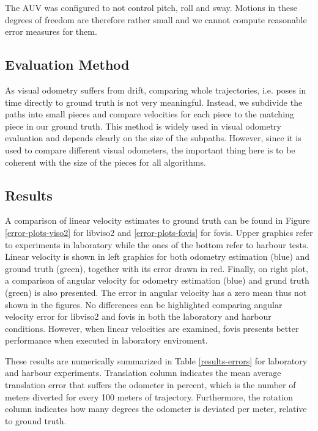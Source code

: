 \documentclass[conference]{IEEEtran}
\begin{document}
The AUV was configured to not control pitch, roll and sway. Motions in these degrees of freedom are therefore rather small and we cannot compute reasonable error measures for them.

\subsection{Evaluation Method
  \label{evaluation-method}
}

As visual odometry suffers from drift, comparing whole trajectories, i.e. poses in time directly to ground truth is not very meaningful. Instead, we subdivide the paths into small pieces and compare velocities for each piece to the matching piece in our ground truth. This method is widely used in visual odometry evaluation \cite{Kitti2013} and depends clearly on the size of the subpaths. However, since it is used to compare different visual odometers, the important thing here is to be coherent with the size of the pieces for all algorithms.

\subsection{Results
  \label{results}
}

A comparison of linear velocity estimates to ground truth can be found in Figure \ref{error-plots-viso2} for libviso2 and \ref{error-plots-fovis} for fovis. Upper graphics refer to experiments in laboratory while the ones of the bottom refer to harbour tests. Linear velocity is shown in left graphics for both odometry estimation (blue) and ground truth (green), together with its error drawn in red. Finally, on right plot, a comparison of angular velocity for odometry estimation (blue) and grund truth (green) is also presented. The error in angular velocity has a zero mean thus not shown in the figures. No differences can be highlighted comparing angular velocity error for libviso2 and fovis in both the laboratory and harbour conditions. However, when linear velocities are examined, fovis presents better performance when executed in laboratory enviroment.

These results are numerically summarized in Table \ref{results-errors} for laboratory and harbour experiments. Translation column indicates the mean average translation error that suffers the odometer in percent, which is the number of meters diverted for every 100 meters of trajectory. Furthermore, the rotation column indicates how many degrees the odometer is deviated per meter, relative to ground truth.
\end{document}
